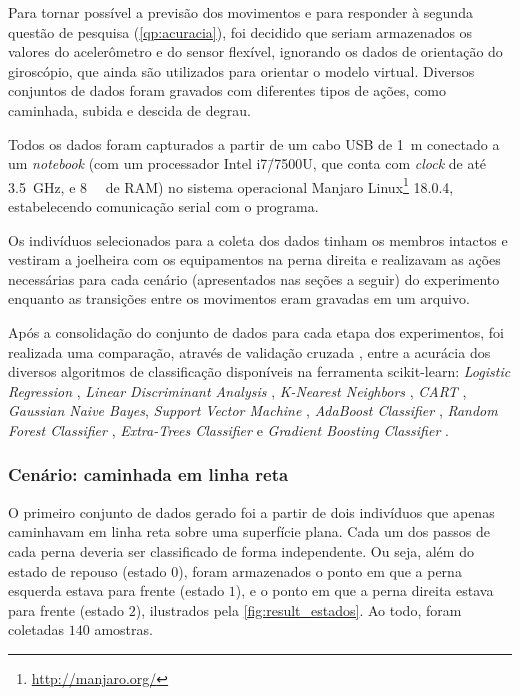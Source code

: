 Para tornar possível a previsão dos movimentos e para responder à segunda questão de pesquisa (\ref{qp:acuracia}), foi decidido que seriam armazenados os valores do acelerômetro e do sensor flexível, ignorando os dados de orientação do giroscópio, que ainda são utilizados para orientar o modelo virtual. Diversos conjuntos de dados foram gravados com diferentes tipos de ações, como caminhada, subida e descida de degrau.

Todos os dados foram capturados a partir de um cabo USB de \SI{1}{\meter} conectado a um \textit{notebook} (com um processador Intel i7\=/7500U, que conta com \textit{clock} de até \SI{3.5}{\giga\hertz}, e \SI{8}{\giga\byte} de RAM) no sistema operacional Manjaro Linux\footnote{\url{http://manjaro.org/}} 18.0.4, estabelecendo comunicação serial com o programa.

Os indivíduos selecionados para a coleta dos dados tinham os membros intactos e vestiram a joelheira com os equipamentos na perna direita e realizavam as ações necessárias para cada cenário (apresentados nas seções a seguir) do experimento enquanto as transições entre os movimentos eram gravadas em um arquivo.

Após a consolidação do conjunto de dados para cada etapa dos experimentos, foi realizada uma comparação, através de validação cruzada \cite{scikit:crossval}, entre a acurácia dos diversos algoritmos de classificação disponíveis na ferramenta scikit-learn: \textit{Logistic Regression} \cite{scikit:lr}, \textit{Linear Discriminant Analysis} \cite{scikit:lda}, \textit{K-Nearest Neighbors} \cite{scikit:knn}, \textit{CART} \cite{scikit:cart}, \textit{Gaussian Naive Bayes}\cite{scikit:nb}, \textit{Support Vector Machine} \cite{scikit:svm}, \textit{AdaBoost Classifier} \cite{scikit:adb}, \textit{Random Forest Classifier} \cite{scikit:rfc}, \textit{Extra-Trees Classifier} \cite{scikit:etc} e \textit{Gradient Boosting Classifier} \cite{scikit:gbc}.

\subsubsection{Cenário: caminhada em linha reta}

O primeiro conjunto de dados gerado foi a partir de dois indivíduos que apenas caminhavam em linha reta sobre uma superfície plana. Cada um dos passos de cada perna deveria ser classificado de forma independente. Ou seja, além do estado de repouso (estado \(0\)), foram armazenados o ponto em que a perna esquerda estava para frente (estado \(1\)), e o ponto em que a perna direita estava para frente (estado \(2\)), ilustrados pela \autoref{fig:result_estados}. Ao todo, foram coletadas \(140\) amostras.

